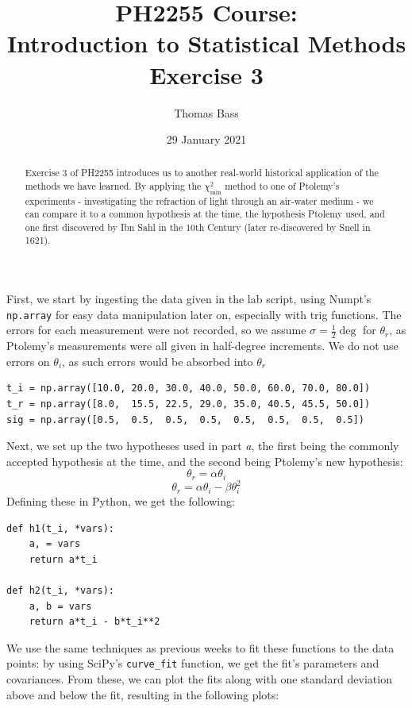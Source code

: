 \documentclass[a4paper]{article}
\title{PH2255 Course:\\
Introduction to Statistical Methods\\Exercise 3}
\author{Thomas Bass}
\date{29 January 2021}
\begin{document}
\maketitle

\begin{abstract}
Exercise 3 of PH2255 introduces us to another real-world historical application of the methods we have learned. By applying the $\chi^2_\text{min}$ method to one of Ptolemy's experiments - investigating the refraction of light through an air-water medium - we can compare it to a common hypothesis at the time, the hypothesis Ptolemy used, and one first discovered by Ibn Sahl in the 10th Century (later re-discovered by Snell in 1621).
\end{abstract}

First, we start by ingesting the data given in the lab script, using Numpt's \lstinline$np.array$ for easy data manipulation later on, especially with trig functions. The errors for each measurement were not recorded, so we assume $\sigma = \frac12\deg$ for $\theta_r$, as Ptolemy's measurements were all given in half-degree increments. We do not use errors on $\theta_i$, as such errors would be absorbed into $\theta_r$
\begin{lstlisting}
t_i = np.array([10.0, 20.0, 30.0, 40.0, 50.0, 60.0, 70.0, 80.0])
t_r = np.array([8.0,  15.5, 22.5, 29.0, 35.0, 40.5, 45.5, 50.0])
sig = np.array([0.5,  0.5,  0.5,  0.5,  0.5,  0.5,  0.5,  0.5])
\end{lstlisting}

Next, we set up the two hypotheses used in part {\it a}, the first being the commonly accepted hypothesis at the time, and the second being Ptolemy's new hypothesis:
\begin{equation}
\theta_r=\alpha\theta_i
\end{equation}
\begin{equation}
\theta_r=\alpha\theta_i - \beta\theta_i^2
\end{equation}
Defining these in Python, we get the following:
\begin{lstlisting}
def h1(t_i, *vars):
    a, = vars
    return a*t_i

def h2(t_i, *vars):
    a, b = vars
    return a*t_i - b*t_i**2
\end{lstlisting}
We use the same techniques as previous weeks to fit these functions to the data points: by using SciPy's \lstinline$curve_fit$ function, we get the fit's parameters and covariances. From these, we can plot the fits along with one standard deviation above and below the fit, resulting in the following plots: 
\end{document}

